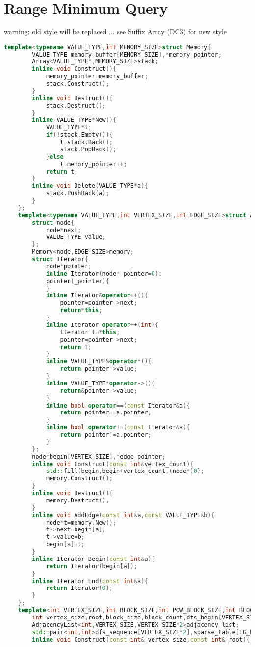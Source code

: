 \documentclass{book}
\begin{document}
\section{Range Minimum Query}
warning: old style will be replaced ... see Suffix Array (DC3) for new style\begin{lstlisting}[language=C++,title={Range Minimum Query.hpp (7403 bytes, 228 lines)}]
template<typename VALUE_TYPE,int MEMORY_SIZE>struct Memory{
		VALUE_TYPE memory_buffer[MEMORY_SIZE],*memory_pointer;
		Array<VALUE_TYPE*,MEMORY_SIZE>stack;
		inline void Construct(){
			memory_pointer=memory_buffer;
			stack.Construct();
		}
		inline void Destruct(){
			stack.Destruct();
		}
		inline VALUE_TYPE*New(){
			VALUE_TYPE*t;
			if(!stack.Empty()){
				t=stack.Back();
				stack.PopBack();
			}else
				t=memory_pointer++;
			return t;
		}
		inline void Delete(VALUE_TYPE*a){
			stack.PushBack(a);
		}
	};
	template<typename VALUE_TYPE,int VERTEX_SIZE,int EDGE_SIZE>struct AdjacencyList{
		struct node{
			node*next;
			VALUE_TYPE value;
		};
		Memory<node,EDGE_SIZE>memory;
		struct Iterator{
			node*pointer;
			inline Iterator(node*_pointer=0):
			pointer(_pointer){
			}
			inline Iterator&operator++(){
				pointer=pointer->next;
				return*this;
			}
			inline Iterator operator++(int){
				Iterator t=*this;
				pointer=pointer->next;
				return t;
			}
			inline VALUE_TYPE&operator*(){
				return pointer->value;
			}
			inline VALUE_TYPE*operator->(){
				return&pointer->value;
			}
			inline bool operator==(const Iterator&a){
				return pointer==a.pointer;
			}
			inline bool operator!=(const Iterator&a){
				return pointer!=a.pointer;
			}
		};
		node*begin[VERTEX_SIZE],*edge_pointer;
		inline void Construct(const int&vertex_count){
			std::fill(begin,begin+vertex_count,(node*)0);
			memory.Construct();
		}
		inline void Destruct(){
			memory.Destruct();
		}
		inline void AddEdge(const int&a,const VALUE_TYPE&b){
			node*t=memory.New();
			t->next=begin[a];
			t->value=b;
			begin[a]=t;
		}
		inline Iterator Begin(const int&a){
			return Iterator(begin[a]);
		}
		inline Iterator End(const int&a){
			return Iterator(0);
		}
	};
	template<int VERTEX_SIZE,int BLOCK_SIZE,int POW_BLOCK_SIZE,int BLOCK_COUNT,int LG_BLOCK_COUNT>struct LowestCommonAncestor{
		int vertex_size,root,block_size,block_count,dfs_begin[VERTEX_SIZE],lg[BLOCK_COUNT],block[POW_BLOCK_SIZE][BLOCK_SIZE][BLOCK_SIZE],block_index[BLOCK_COUNT];
		AdjacencyList<int,VERTEX_SIZE,VERTEX_SIZE*2>adjacency_list;
		std::pair<int,int>dfs_sequence[VERTEX_SIZE*2],sparse_table[LG_BLOCK_COUNT][BLOCK_COUNT];
		inline void Construct(const int&_vertex_size,const int&_root){

\end{lstlisting}
\end{document}
